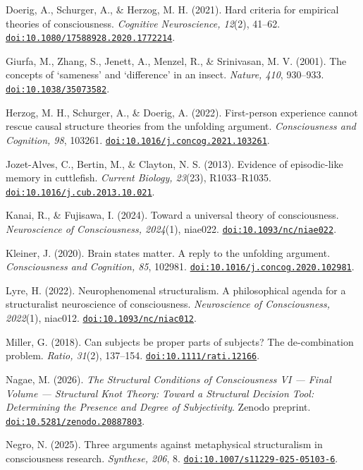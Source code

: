 \documentclass[
  11pt,
  a4paper,
]{article}
\begin{document}
Doerig, A., Schurger, A., \& Herzog, M. H. (2021). Hard criteria for
empirical theories of consciousness. \emph{Cognitive Neuroscience,
12}(2), 41--62.
\href{https://doi.org/10.1080/17588928.2020.1772214}{\nolinkurl{doi:10.1080/17588928.2020.1772214}}.

Giurfa, M., Zhang, S., Jenett, A., Menzel, R., \& Srinivasan, M. V.
(2001). The concepts of `sameness' and `difference' in an insect.
\emph{Nature, 410}, 930--933.
\href{https://doi.org/10.1038/35073582}{\nolinkurl{doi:10.1038/35073582}}.

Herzog, M. H., Schurger, A., \& Doerig, A. (2022). First-person
experience cannot rescue causal structure theories from the unfolding
argument. \emph{Consciousness and Cognition, 98}, 103261.
\href{https://doi.org/10.1016/j.concog.2021.103261}{\nolinkurl{doi:10.1016/j.concog.2021.103261}}.

Jozet-Alves, C., Bertin, M., \& Clayton, N. S. (2013). Evidence of
episodic-like memory in cuttlefish. \emph{Current Biology, 23}(23),
R1033--R1035.
\href{https://doi.org/10.1016/j.cub.2013.10.021}{\nolinkurl{doi:10.1016/j.cub.2013.10.021}}.

Kanai, R., \& Fujisawa, I. (2024). Toward a universal theory of
consciousness. \emph{Neuroscience of Consciousness, 2024}(1), niae022.
\href{https://doi.org/10.1093/nc/niae022}{\nolinkurl{doi:10.1093/nc/niae022}}.

Kleiner, J. (2020). Brain states matter. A reply to the unfolding
argument. \emph{Consciousness and Cognition, 85}, 102981.
\href{https://doi.org/10.1016/j.concog.2020.102981}{\nolinkurl{doi:10.1016/j.concog.2020.102981}}.

Lyre, H. (2022). Neurophenomenal structuralism. A philosophical agenda
for a structuralist neuroscience of consciousness. \emph{Neuroscience of
Consciousness, 2022}(1), niac012.
\href{https://doi.org/10.1093/nc/niac012}{\nolinkurl{doi:10.1093/nc/niac012}}.

Miller, G. (2018). Can subjects be proper parts of subjects? The
de-combination problem. \emph{Ratio, 31}(2), 137--154.
\href{https://doi.org/10.1111/rati.12166}{\nolinkurl{doi:10.1111/rati.12166}}.

Nagae, M. (2026). \emph{The Structural Conditions of Consciousness VI
--- Final Volume --- Structural Knot Theory: Toward a Structural
Decision Tool: Determining the Presence and Degree of Subjectivity}.
Zenodo preprint.
\href{https://doi.org/10.5281/zenodo.20887803}{\nolinkurl{doi:10.5281/zenodo.20887803}}.

Negro, N. (2025). Three arguments against metaphysical structuralism in
consciousness research. \emph{Synthese, 206}, 8.
\href{https://doi.org/10.1007/s11229-025-05103-6}{\nolinkurl{doi:10.1007/s11229-025-05103-6}}.
\end{document}
